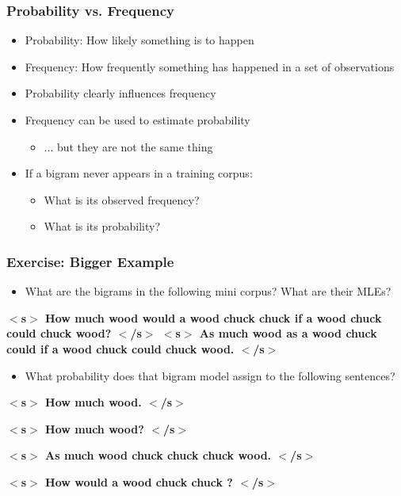 \documentclass{beamer}
\begin{document}
\begin{frame}
\frametitle{Probability vs. Frequency}
\begin{itemize}
	\item Probability: How likely something is to happen
	\item Frequency: How frequently something has happened in a set of observations
	\item Probability clearly influences frequency
	\item Frequency can be used to estimate probability 
	\begin{itemize}
		\item ... but they are not the same thing
	\end{itemize}
	\item If a bigram never appears in a training corpus:
	\begin{itemize}
		\item What is its observed frequency?
		\item What is its probability?
	\end{itemize}
\end{itemize}
\end{frame}


\begin{frame}
\frametitle{Exercise: Bigger Example}
\begin{itemize}
\item What are the bigrams in the following mini corpus?  What are their MLEs?
\end{itemize}

{\bf $<$s$>$ How much wood would a wood chuck chuck if a wood chuck 
could chuck wood? $<$/s$>$ $<$s$>$ As much wood as a wood chuck could if a wood chuck could chuck wood. $<$/s$>$ }

\begin{itemize}
\item What probability does that bigram model assign to the following sentences?
\end{itemize}

{\bf $<$s$>$ How much wood. $<$/s$>$}

{\bf$<$s$>$ How much wood? $<$/s$>$}

{\bf$<$s$>$ As much wood chuck chuck chuck wood. $<$/s$>$}

{\bf$<$s$>$ How would a wood chuck chuck ? $<$/s$>$}

\end{frame}
\end{document}
